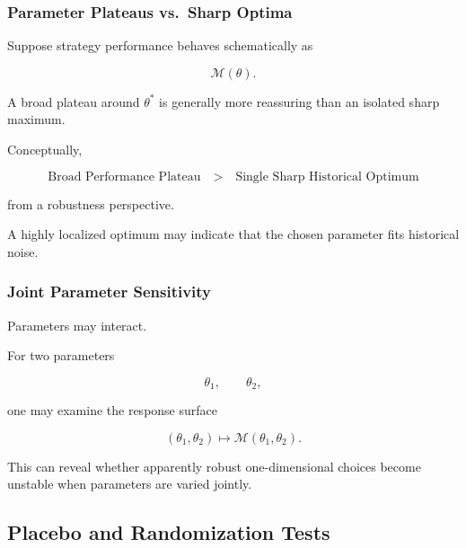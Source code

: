 \documentclass[11pt,a4paper]{article}
\begin{document}
\subsubsection{Parameter Plateaus vs.\ Sharp Optima}

Suppose strategy performance behaves schematically as

\begin{equation}
\mathcal{M}(\theta).
\end{equation}

A broad plateau around $\theta^*$ is generally more reassuring than an isolated
sharp maximum.

Conceptually,

\begin{equation}
\boxed{
\text{Broad Performance Plateau}
\quad>\quad
\text{Single Sharp Historical Optimum}
}
\end{equation}

from a robustness perspective.

A highly localized optimum may indicate that the chosen parameter fits
historical noise.


\subsubsection{Joint Parameter Sensitivity}

Parameters may interact.

For two parameters

\begin{equation}
\theta_1,
\qquad
\theta_2,
\end{equation}

one may examine the response surface

\begin{equation}
\boxed{
(\theta_1,\theta_2)
\longmapsto
\mathcal{M}
\left(
\theta_1,\theta_2
\right).
}
\end{equation}

This can reveal whether apparently robust one-dimensional choices become
unstable when parameters are varied jointly.


\subsection{Placebo and Randomization Tests}
\label{subsec:placebo_randomization_tests}
\end{document}
